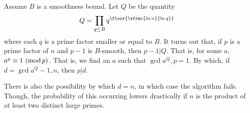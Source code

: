 \documentclass{subfiles}
\begin{document}
    Assume \(B\) is a smoothness bound. Let \(Q\) be the quantity
        \[
            Q = \prod_{q \le B} q^{\floor{\sfrac{\ln n}{\ln q}}}
        \]
        where each \(q\) is a prime factor smaller or equal to \(B\).
        It turns out that, if \(p\) is a prime factor of \(n\) and \(p - 1\) is \(B\)-smooth,
        then \(p - 1 | Q\). That is, for some \(a\), \(a^{q} \equiv 1 \mod\).
        That is, we find an \(a\) such that \(\gcd{a^{Q}, p} = 1\).
        By which, if \(d = \gcd{a^{Q} - 1, n}\), then \(p | d\).

    There is also the possibility by which \(d = n\), in which case the algorithm fails.
        Though, the probability of this occurring lowers drastically if \(n\) is the product of at 
        least two distinct large primes.
\end{document}
